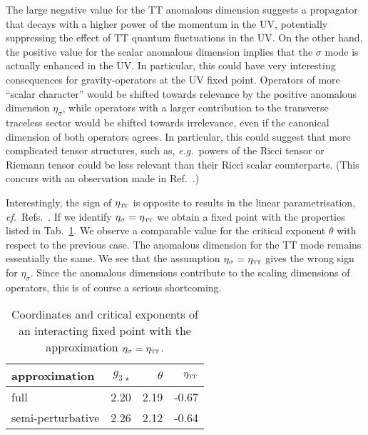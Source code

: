 \documentclass[11pt]{book}
\newcommand\TTspace{ -1pt }
\newcommand\etaTT{ \eta_{\scriptscriptstyle{\mathrm{T\hspace{\TTspace}T}}} }
\newcommand\eg{\textit{e.g.}\ }
\newcommand\cf{\textit{cf.}\ }
\numberwithin{equation}{chapter}
\begin{document}
The large negative value for the $\mathrm{TT}$ anomalous dimension suggests a propagator that decays with a
higher power of the momentum in the UV, potentially suppressing the effect of $\mathrm{TT}$ quantum
fluctuations in the UV.
On the other hand, the positive value for the scalar anomalous dimension implies that the
$\sigma$ mode is actually enhanced in the UV.
In particular, this could have very interesting consequences for gravity-operators at the UV fixed point.
Operators of more ``scalar character'' would be shifted towards relevance by the positive anomalous
dimension $\eta_{\sigma}$, while operators with a larger contribution to the transverse traceless sector
would be shifted towards irrelevance, even if the canonical dimension of both operators agrees.
In particular, this could suggest that more complicated tensor structures,
such as, \eg powers of the Ricci tensor or Riemann tensor could be less relevant than their
Ricci scalar counterparts.
(This concurs with an observation made in Ref.~\cite{Codello:2006in}.)

Interestingly, the sign of $\etaTT$ is opposite to results in the
linear parametrisation, \cf Refs.~\cite{Codello:2013fpa, Dona:2013qba, Christiansen:2014raa}.
If we identify $\eta_{\sigma} = \etaTT$ we obtain a fixed point with the properties
listed in Tab.~\ref{puregravityFPetaapprox}.
We observe a comparable value for the critical exponent $\theta$ with  respect to the previous case.
The anomalous dimension for the $\mathrm{TT}$ mode remains essentially the same.
We see that the assumption $\eta_{\sigma}=\etaTT$ gives the wrong sign for $\eta_\sigma$.
Since the anomalous dimensions contribute to the scaling dimensions of operators,
this is of course a serious shortcoming.

\begin{table}
  \begin{center}
  \begin{tabular}{ l r r r }
    \toprule
    approximation     & $g_{3\,\star}$ & $\theta$ & $\etaTT$ \\
    \midrule
    full              & 2.20          & 2.19     & -0.67 \\
    semi-perturbative & 2.26          & 2.12     & -0.64 \\
    \bottomrule
  \end{tabular}
  \end{center}
  \caption[Coordinates and critical exponents of fixed points]
  {
    Coordinates and critical exponents of an interacting fixed point with the
    approximation $\eta_{\sigma} = \etaTT$.
  }
  \label{puregravityFPetaapprox}
\end{table}
\end{document}
